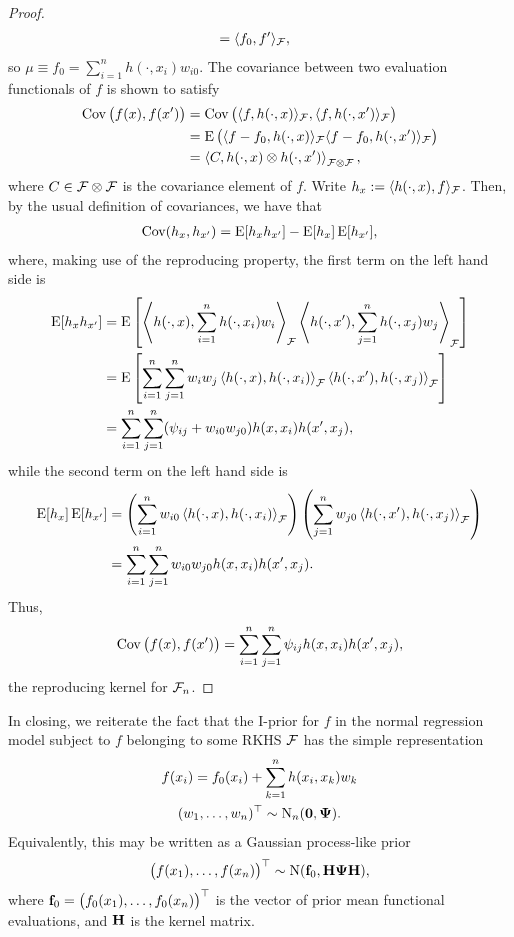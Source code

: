 \begin{proof}
\begin{align*}
    &= \langle f_0,f' \rangle_{{\mathcal F}},
  \end{align*}
  so $\mu \equiv f_0 = \sum_{i=1}^n h(\cdot,x_i)w_{i0}$. 
  The covariance between two evaluation functionals of $f$ is shown to satisfy 
  \begin{align*}
    \operatorname{Cov}\big(f(x),f(x')\big) 
    &= \operatorname{Cov}\big(\langle f,h(\cdot,x)\rangle_{{\mathcal F}}, \langle f,h(\cdot,x')\rangle_{{\mathcal F}} \big) \\
    &= \operatorname{E}\big(\langle f-f_0,h(\cdot,x)\rangle_{{\mathcal F}}\langle f-f_0,h(\cdot,x')\rangle_{{\mathcal F}} \big) \\
    &= \left\langle C, h(\cdot,x) \otimes h(\cdot,x') \right\rangle_{{\mathcal F} \otimes {\mathcal F}},
  \end{align*}
  where $C \in {\mathcal F}\otimes{\mathcal F}$ is the covariance element of $f$.
  Write $h_{x} := \langle h(\cdot,x),f \rangle_{{\mathcal F}}$. 
  Then, by the usual definition of covariances, we have that 
  \begin{align*}
    \operatorname{Cov}(h_x,h_{x'}) = \operatorname{E}[h_xh_{x'}] - \operatorname{E}[h_x]\operatorname{E}[h_{x'}],
  \end{align*}
  where, making use of the reproducing property, the first term on the left hand side is
  \begin{align*}
    \operatorname{E}[h_xh_{x'}] 
    &= \operatorname{E} \left[ 
    \left\langle h(\cdot,x), \sum_{i=1}^n h(\cdot,x_i)w_i \right\rangle_{{\mathcal F}} 
    \left\langle h(\cdot,x'), \sum_{j=1}^n h(\cdot,x_j)w_j \right\rangle_{{\mathcal F}} 
    \right] \\
    &= \operatorname{E} \left[ 
    \sum_{i=1}^n\sum_{j=1}^n w_iw_j \left\langle  h(\cdot,x), h(\cdot,x_i) \right\rangle_{{\mathcal F}} 
     \left\langle h(\cdot,x'), h(\cdot,x_j)\right\rangle_{{\mathcal F}} 
    \right] \\
    &= \sum_{i=1}^n\sum_{j=1}^n (\psi_{ij} + w_{i0}w_{j0}) h(x,x_i) h(x',x_j),
  \end{align*}
  while the second term on the left hand side is
  \begin{align*}
    \operatorname{E}[h_x]\operatorname{E}[h_{x'}]
    &= \left( \sum_{i=1}^n w_{i0} \left\langle  h(\cdot,x), h(\cdot,x_i)  \right\rangle_{{\mathcal F}} \right)
    \left( \sum_{j=1}^n w_{j0} \left\langle  h(\cdot,x'), h(\cdot,x_j)  \right\rangle_{{\mathcal F}} \right) \\
    &= \sum_{i=1}^n \sum_{j=1}^n w_{i0}w_{j0} h(x,x_i)h(x',x_j).
  \end{align*}  
  Thus,
  \[
    \operatorname{Cov}\big( f(x),f(x') \big) = \sum_{i=1}^n\sum_{j=1}^n \psi_{ij} h(x,x_i) h(x',x_j),
  \]
  the reproducing kernel for ${\mathcal F}_n$.
\end{proof}

In closing, we reiterate the fact that the I-prior for $f$ in the normal regression model subject to $f$ belonging to some RKHS ${\mathcal F}$ has the simple representation
\begin{align*}
  \begin{gathered}
    f(x_i) = f_0(x_i) + \sum_{k=1}^n h(x_i,x_k)w_k \\
    (w_1,\dots,w_n)^\top \sim \operatorname{N}_n({\mathbf 0},{\bm\Psi}).
  \end{gathered}
\end{align*}
Equivalently, this may be written as a Gaussian process-like prior 
\[
  \big(f(x_1),\dots,f(x_n) \big)^\top \sim \operatorname{N}({\mathbf f}_0,{\mathbf H}{\bm\Psi}{\mathbf H}),
\]
where ${\mathbf f}_0 = \big(f_0(x_1),\dots,f_0(x_n) \big)^\top$ is the vector of prior mean functional evaluations, and ${\mathbf H}$ is the kernel matrix.
